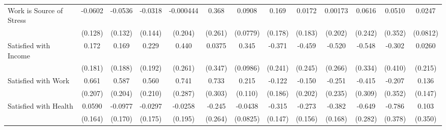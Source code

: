 {\begin{tabular}{l*{12}{c}}
\addlinespace
Work is Source of Stress&     -0.0602         &     -0.0536         &     -0.0318         &   -0.000444         &       0.368         &      0.0908         &       0.169         &      0.0172         &     0.00173         &      0.0616         &      0.0510         &      0.0247         \\
            &     (0.128)         &     (0.132)         &     (0.144)         &     (0.204)         &     (0.261)         &    (0.0779)         &     (0.178)         &     (0.183)         &     (0.202)         &     (0.242)         &     (0.352)         &    (0.0812)         \\
\addlinespace
Satisfied with Income&       0.172         &       0.169         &       0.229         &       0.440         &      0.0375         &       0.345\sym{***}&      -0.371         &      -0.459         &      -0.520         &      -0.548         &      -0.302         &      0.0260         \\
            &     (0.181)         &     (0.188)         &     (0.192)         &     (0.261)         &     (0.347)         &    (0.0986)         &     (0.241)         &     (0.245)         &     (0.266)         &     (0.334)         &     (0.410)         &     (0.215)         \\
\addlinespace
Satisfied with Work&       0.661\sym{**} &       0.587\sym{**} &       0.560\sym{**} &       0.741\sym{**} &       0.733\sym{*}  &       0.215         &      -0.122         &      -0.150         &      -0.251         &      -0.415         &      -0.207         &       0.136         \\
            &     (0.207)         &     (0.204)         &     (0.210)         &     (0.287)         &     (0.303)         &     (0.110)         &     (0.186)         &     (0.202)         &     (0.235)         &     (0.309)         &     (0.352)         &     (0.147)         \\
\addlinespace
Satisfied with Health&      0.0590         &     -0.0977         &     -0.0297         &     -0.0258         &      -0.245         &     -0.0438         &      -0.315\sym{*}  &      -0.273         &      -0.382\sym{*}  &      -0.649\sym{*}  &      -0.786\sym{*}  &       0.103         \\
            &     (0.164)         &     (0.170)         &     (0.175)         &     (0.195)         &     (0.264)         &    (0.0825)         &     (0.147)         &     (0.156)         &     (0.168)         &     (0.282)         &     (0.378)         &     (0.350)         \\

\end{tabular}}
